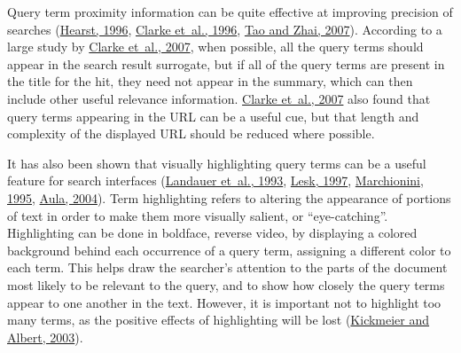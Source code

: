 \documentclass[sigconf,nonacm,screen,pbalance]{acmart}
\begin{document}
Query term proximity information can be quite effective at improving precision of searches (\href{https://searchuserinterfaces.com/book/sui_references.html#hearst96a}{Hearst, 1996}, \href{https://searchuserinterfaces.com/book/sui_references.html#clarke96}{ Clarke et~al., 1996}, \href{https://searchuserinterfaces.com/book/sui_references.html#tao:aeo}{ Tao and Zhai, 2007}). According to a large study by \href{https://searchuserinterfaces.com/book/sui_references.html#clarke2007icf}{Clarke et~al., 2007}, when possible, all the query terms should
appear in the search result surrogate, but if all of the query terms are present in the title for the
hit, they need not appear in the summary, which can then include other useful relevance information. \href{https://searchuserinterfaces.com/book/sui_references.html#clarke2007icf}{Clarke et~al., 2007} also found that query terms appearing in
the URL can be a useful cue, but that length and complexity of the displayed URL should be reduced where
possible.

It has also been shown that visually highlighting query terms can be a useful feature for search
interfaces (\href{https://searchuserinterfaces.com/book/sui_references.html#landauer93}{Landauer et~al., 1993}, \href{https://searchuserinterfaces.com/book/sui_references.html#lesk97}{ Lesk, 1997}, \href{https://searchuserinterfaces.com/book/sui_references.html#marchionini95}{ Marchionini, 1995}, \href{https://searchuserinterfaces.com/book/sui_references.html#aula2004ers}{ Aula, 2004}). Term highlighting refers to altering
the appearance of portions of text in order to make them more visually salient, or ``eye-catching''.
Highlighting can be done in boldface, reverse video, by displaying a colored background behind each
occurrence of a query term, assigning a different color to each term. This helps draw the searcher's
attention to the parts of the document most likely to be relevant to the query, and to show how closely
the query terms appear to one another in the text. However, it is important not to highlight too many
terms, as the positive effects of highlighting will be lost (\href{https://searchuserinterfaces.com/book/sui_references.html#kickmeier2003esi}{Kickmeier and Albert, 2003}).
\end{document}
